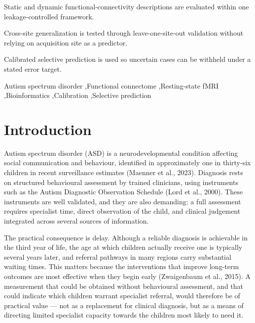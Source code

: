 \documentclass[a4paper,fleqn]{cas-sc}
\begin{document}
\begin{highlights}
\item Static and dynamic functional-connectivity descriptions are evaluated within one leakage-controlled framework.
\item Cross-site generalization is tested through leave-one-site-out validation without relying on acquisition site as a predictor.
\item Calibrated selective prediction is used so uncertain cases can be withheld under a stated error target.
\end{highlights}

\begin{keywords}
Autism spectrum disorder \sep Functional connectome \sep Resting-state fMRI \sep Bioinformatics \sep Calibration \sep Selective prediction
\end{keywords}

\maketitle

\section{Introduction}
\label{sec:introduction}

Autism spectrum disorder (ASD) is a neurodevelopmental condition affecting social communication and behaviour, identified in approximately one in thirty-six children in recent surveillance estimates (Maenner et al., 2023). Diagnosis rests on structured behavioural assessment by trained clinicians, using instruments such as the Autism Diagnostic Observation Schedule (Lord et al., 2000). These instruments are well validated, and they are also demanding: a full assessment requires specialist time, direct observation of the child, and clinical judgement integrated across several sources of information.

The practical consequence is delay. Although a reliable diagnosis is achievable in the third year of life, the age at which children actually receive one is typically several years later, and referral pathways in many regions carry substantial waiting times. This matters because the interventions that improve long-term outcomes are most effective when they begin early (Zwaigenbaum et al., 2015). A measurement that could be obtained without behavioural assessment, and that could indicate which children warrant specialist referral, would therefore be of practical value — not as a replacement for clinical diagnosis, but as a means of directing limited specialist capacity towards the children most likely to need it.
\end{document}
